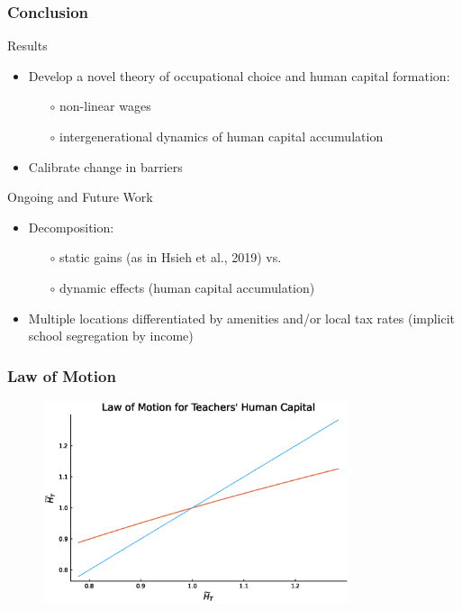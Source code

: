 \documentclass[11pt]{beamer}
\begin{document}
\begin{frame}
	\frametitle{Conclusion}
	\textcolor{tblue}{Results}
	\begin{itemize}
		\item Develop a novel theory of occupational choice and human capital formation: 
		\begin{itemize}
			\item[$\circ$] non-linear wages %
			\item[$\circ$] intergenerational dynamics of human capital accumulation
		\end{itemize}
		\item Calibrate change in barriers
	\end{itemize}
	\textcolor{tblue}{Ongoing and Future Work}
	\begin{itemize}	
        \item Decomposition:
            \begin{itemize}
			\item[$\circ$] static gains (as in Hsieh et al., 2019) vs.
			\item[$\circ$] dynamic effects (human capital accumulation)
		\end{itemize}
		\item Multiple locations differentiated by amenities and/or local tax rates (implicit school segregation by income)
	\end{itemize}
\end{frame}

\begin{frame}
\frametitle{Law of Motion}
\begin{figure}
\begin{center}
\includegraphics[width=0.8\textwidth]{plots/LoM.eps}
\label{ }
\end{center}
\end{figure}
\end{frame}
\end{document}
